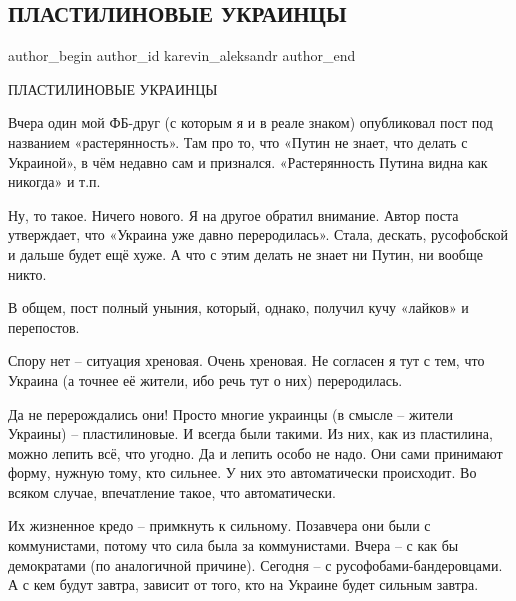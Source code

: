  
 
 
 
 
 
\subsection{ПЛАСТИЛИНОВЫЕ УКРАИНЦЫ}
\label{sec:25_10_2021.fb.karevin_aleksandr.1.plastilin_ukraincy}
 
\ifcmt
 author_begin
   author_id karevin_aleksandr
 author_end
\fi

ПЛАСТИЛИНОВЫЕ УКРАИНЦЫ

Вчера один мой ФБ-друг (с которым я и в реале знаком) опубликовал пост под
названием «растерянность». Там про то, что «Путин не знает, что делать с
Украиной», в чём недавно сам и признался. «Растерянность Путина видна как
никогда» и т.п.

Ну, то такое. Ничего нового. Я на другое обратил внимание. Автор поста
утверждает, что «Украина уже давно переродилась». Стала, дескать, русофобской и
дальше будет ещё хуже. А что с этим делать не знает ни Путин, ни вообще никто. 

В общем, пост полный уныния, который, однако, получил кучу «лайков» и
перепостов.

Спору нет – ситуация хреновая. Очень хреновая. Не согласен я тут с тем, что
Украина (а точнее её жители, ибо речь тут о них) переродилась.

Да не перерождались они! Просто многие украинцы (в смысле – жители Украины) –
пластилиновые. И всегда были такими. Из них, как из пластилина, можно лепить
всё, что угодно. Да и лепить особо не надо. Они сами принимают форму, нужную
тому, кто сильнее. У них это автоматически происходит. Во всяком случае,
впечатление такое, что автоматически.

Их жизненное кредо – примкнуть к сильному. Позавчера они были с коммунистами,
потому что сила была  за коммунистами. Вчера –  с как бы демократами (по
аналогичной причине). Сегодня –  с русофобами-бандеровцами. А с кем будут
завтра, зависит от того, кто на Украине будет сильным завтра.

